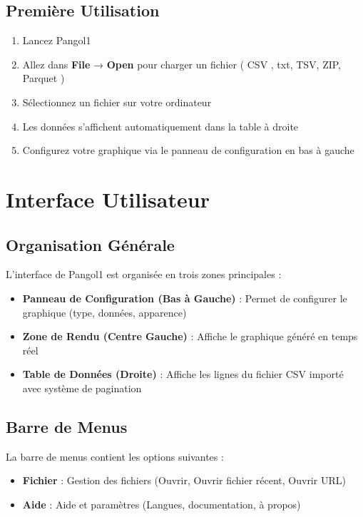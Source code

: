 \documentclass[11pt, a4paper]{article}
\begin{document}
\subsection{Première Utilisation}
\begin{enumerate}
    \item Lancez Pangol1
    \item Allez dans \textbf{File} → \textbf{Open} pour charger un fichier ( CSV , txt, TSV, ZIP, Parquet )
    \item Sélectionnez un fichier sur votre ordinateur
    \item Les données s'affichent automatiquement dans la table à droite
    \item Configurez votre graphique via le panneau de configuration en bas à gauche
\end{enumerate}

\section{Interface Utilisateur}

\subsection{Organisation Générale}
L'interface de Pangol1 est organisée en trois zones principales :

\begin{itemize}
    \item \textbf{Panneau de Configuration (Bas à Gauche)} : Permet de configurer le graphique (type, données, apparence)
    
    \item \textbf{Zone de Rendu (Centre Gauche)} : Affiche le graphique généré en temps réel
    
    \item \textbf{Table de Données (Droite)} : Affiche les lignes du fichier CSV importé avec système de pagination
\end{itemize}

\subsection{Barre de Menus}
La barre de menus contient les options suivantes :

\begin{itemize}
    \item \textbf{Fichier} : Gestion des fichiers (Ouvrir, Ouvrir fichier récent, Ouvrir URL)
    \item \textbf{Aide} : Aide et paramètres (Langues, documentation, à propos)
\end{itemize}
\end{document}
